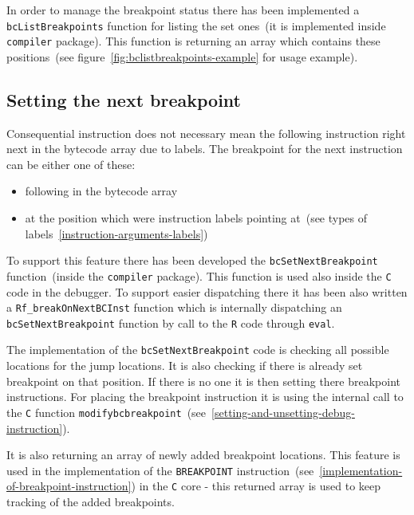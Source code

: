 \documentclass[thesis=M,english]{FITthesis}[2018/10/20]
\newcommand{\code}[1]{\texttt{#1}}
\begin{document}
In order to manage the breakpoint status there has been implemented a \code{bcListBreakpoints} function for listing the set ones~(it is implemented inside \code{compiler} package). This function is returning an array which contains these positions~(see figure~\ref{fig:bclistbreakpoints-example} for usage example).


\subsection{Setting the next breakpoint}\label{setting-next-breakpoint}

Consequential instruction does not necessary mean the following instruction right next in the bytecode array due to labels. The breakpoint for the next instruction can be either one of these:

\begin{itemize}
	\item following in the bytecode array
	\item at the position which were instruction labels pointing at~(see types of labels~\ref{instruction-arguments-labels})
\end{itemize}

To support this feature there has been developed the \code{bcSetNextBreakpoint} function~(inside the \code{compiler} package). This function is used also inside the  \code{C} code in the debugger. To support easier dispatching there it has been also written a \code{Rf{\_}breakOnNextBCInst} function which is internally dispatching an \code{bcSetNextBreakpoint} function by call to the \code{R} code through \code{eval}.

The implementation of the \code{bcSetNextBreakpoint} code is checking all possible locations for the jump locations. It is also checking if there is already set breakpoint on that position. If there is no one it is then setting there breakpoint instructions. For placing the breakpoint instruction it is using the internal call to the \code{C} function \code{modifybcbreakpoint}~(see~\ref{setting-and-unsetting-debug-instruction}).

It is also returning an array of newly added breakpoint locations. This feature is used in the implementation of the \code{BREAKPOINT} instruction~(see~\ref{implementation-of-breakpoint-instruction}) in the \code{C} core - this returned array is used to keep tracking of the added breakpoints.
\end{document}
